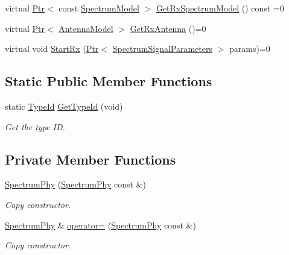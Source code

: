 \begin{DoxyCompactItemize}
virtual \hyperlink{classns3_1_1Ptr}{Ptr}$<$ const \hyperlink{classns3_1_1SpectrumModel}{Spectrum\+Model} $>$ \hyperlink{classns3_1_1SpectrumPhy_a4a6795dab9d65ee90cdfbcea1111ec66}{Get\+Rx\+Spectrum\+Model} () const =0
\item 
virtual \hyperlink{classns3_1_1Ptr}{Ptr}$<$ \hyperlink{classns3_1_1AntennaModel}{Antenna\+Model} $>$ \hyperlink{classns3_1_1SpectrumPhy_a9af15c5f13c28658ed9b8ccdb990ad81}{Get\+Rx\+Antenna} ()=0
\item 
virtual void \hyperlink{classns3_1_1SpectrumPhy_a2442b53be3ce1abf40b05780548a6e66}{Start\+Rx} (\hyperlink{classns3_1_1Ptr}{Ptr}$<$ \hyperlink{structns3_1_1SpectrumSignalParameters}{Spectrum\+Signal\+Parameters} $>$ params)=0
\end{DoxyCompactItemize}
\subsection*{Static Public Member Functions}
\begin{DoxyCompactItemize}
\item 
static \hyperlink{classns3_1_1TypeId}{Type\+Id} \hyperlink{classns3_1_1SpectrumPhy_a7d2e0e29f41332d302706fa1ec329d8b}{Get\+Type\+Id} (void)
\begin{DoxyCompactList}\small\item\em Get the type ID. \end{DoxyCompactList}\end{DoxyCompactItemize}
\subsection*{Private Member Functions}
\begin{DoxyCompactItemize}
\item 
\hyperlink{classns3_1_1SpectrumPhy_a5383942370b0e4176435aa1ae122ace5}{Spectrum\+Phy} (\hyperlink{classns3_1_1SpectrumPhy}{Spectrum\+Phy} const \&)
\begin{DoxyCompactList}\small\item\em Copy constructor. \end{DoxyCompactList}\item 
\hyperlink{classns3_1_1SpectrumPhy}{Spectrum\+Phy} \& \hyperlink{classns3_1_1SpectrumPhy_ab4fd926f1e97005ad247b8ce527e29f0}{operator=} (\hyperlink{classns3_1_1SpectrumPhy}{Spectrum\+Phy} const \&)
\begin{DoxyCompactList}\small\item\em Copy constructor. \end{DoxyCompactList}\end{DoxyCompactItemize}
